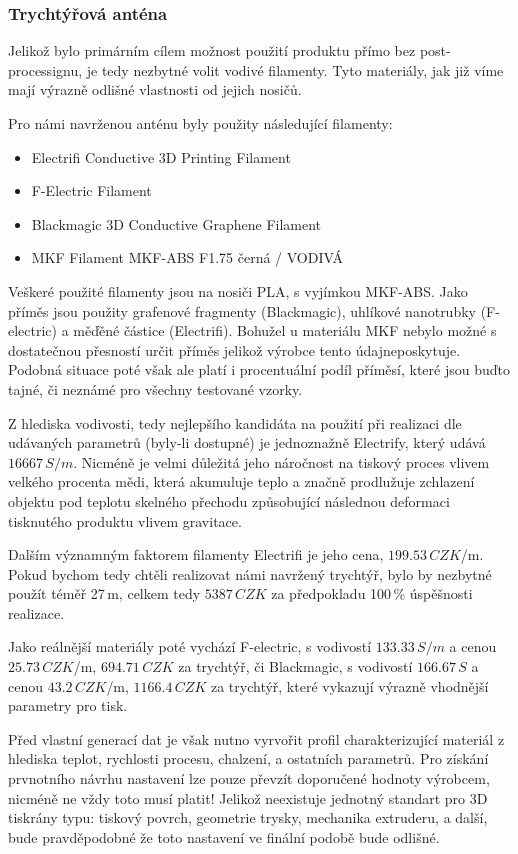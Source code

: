 \subsubsection{Trychtýřová anténa}
Jelikož bylo primárním cílem možnost použití produktu přímo bez post-processignu, je tedy nezbytné volit vodivé filamenty. Tyto materiály, jak již víme mají výrazně odlišné vlastnosti od jejich nosičů.

Pro námi navrženou anténu byly použity následující filamenty:
\begin{itemize}
\item Electrifi Conductive 3D Printing Filament
\item F-Electric Filament
\item Blackmagic 3D Conductive Graphene Filament
\item MKF Filament MKF-ABS F1.75 černá / VODIVÁ
\end{itemize}

Veškeré použité filamenty jsou na nosiči PLA, s vyjímkou MKF-ABS. Jako příměs jsou použity grafenové fragmenty (Blackmagic), uhlíkové nanotrubky (F-electric) a měďěné částice (Electrifi). Bohužel u materiálu MKF nebylo možné s dostatečnou přesností určit příměs jelikož výrobce tento údajneposkytuje. Podobná situace poté však ale platí i procentuální podíl příměsí, které jsou buďto tajné, či neznámé pro všechny testované vzorky.

Z hlediska vodivosti, tedy nejlepšího kandidáta na použití při realizaci dle udávaných parametrů (byly-li dostupné) je jednoznažně Electrify, který udává $16667\,S/m$. Nicméně je velmi důležitá jeho náročnost na tiskový proces vlivem velkého procenta mědi, která akumuluje teplo a značně prodlužuje zchlazení objektu pod teplotu skelného přechodu způsobující následnou deformaci tisknutého produktu vlivem gravitace.

Dalším významným faktorem filamenty Electrifi je jeho cena, $199.53\,CZK$/m. Pokud bychom tedy chtěli realizovat námi navržený trychtýř, bylo by nezbytné použít téměř 27\,m, celkem tedy $5 387\,CZK$ za předpokladu 100\,\% úspěšnosti realizace.

Jako reálnější materiály poté vychází F-electric, s vodivostí $133.33\,S/m$ a cenou $25.73\,CZK$/m, $694.71\,CZK$ za trychtýř, či Blackmagic, s vodivostí $166.67\,S$ a cenou $43.2\,CZK$/m, $1 166.4\,CZK$ za trychtýř, které vykazují výrazně vhodnější parametry pro tisk.

Před vlastní generací dat je však nutno vyrvořit profil charakterizující materiál z hlediska teplot, rychlosti procesu, chalzení, a ostatních parametrů. Pro získání prvnotního návrhu nastavení lze pouze převzít doporučené hodnoty výrobcem, nicméně ne vždy toto musí platit! Jelikož neexistuje jednotný standart pro 3D tiskrány typu: tiskový povrch, geometrie trysky, mechanika extruderu, a další, bude pravděpodobné že toto nastavení ve finální podobě bude odlišné.

